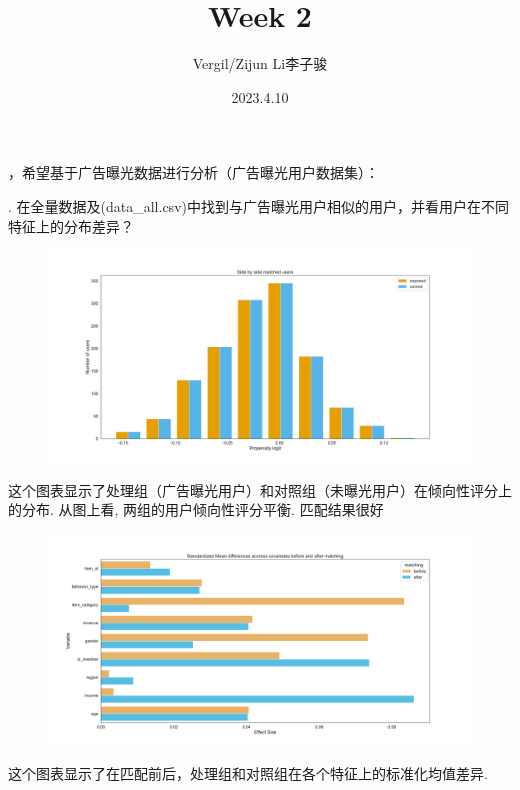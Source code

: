 \documentclass[a4paper]{article}
\author{Vergil/Zijun Li李子骏}
\title{Week 2}
\date{2023.4.10}
\begin{document}
\maketitle
{}，希望基于广告曝光数据进行分析（广告曝光用户数据集）：

.	在全量数据及(data\_all.csv)中找到与广告曝光用户相似的用户，并看用户在不同特征上的分布差异？

\begin{figure}[H]
    \centering
    \includegraphics[width=1\textwidth]{./Side by side matched users.pdf}
    \label{fig:experiment1}
\end{figure}

这个图表显示了处理组（广告曝光用户）和对照组（未曝光用户）在倾向性评分上的分布. 从图上看, 两组的用户倾向性评分平衡. 匹配结果很好

\begin{figure}[H]
    \centering
    \includegraphics[width=1\textwidth]{./Standardized Mean differences accross covariates before an after matching.pdf}
    \label{fig:experiment2}
\end{figure}

这个图表显示了在匹配前后，处理组和对照组在各个特征上的标准化均值差异. 
\end{document}
